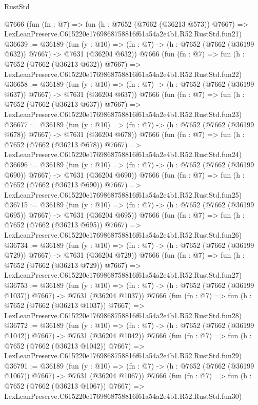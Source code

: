 \begin{lexlean}{RustStd}
\begin{coremodule}
    @7666
    (fun (fn : @7) =>
    fun (h : @7652 (@7662 (@36213 @573)) @7667) =>
    LexLeanPreserve.C615220e1769868758816f61a54a2e4b1.R52.RustStd.fun21)
@36639 := @36189
    (fun (y : @10) => (fn : @7) -> (h : @7652 (@7662 (@36199 @632)) @7667) -> @7631 (@36204 @632))
    @7666
    (fun (fn : @7) =>
    fun (h : @7652 (@7662 (@36213 @632)) @7667) =>
    LexLeanPreserve.C615220e1769868758816f61a54a2e4b1.R52.RustStd.fun22)
@36658 := @36189
    (fun (y : @10) => (fn : @7) -> (h : @7652 (@7662 (@36199 @637)) @7667) -> @7631 (@36204 @637))
    @7666
    (fun (fn : @7) =>
    fun (h : @7652 (@7662 (@36213 @637)) @7667) =>
    LexLeanPreserve.C615220e1769868758816f61a54a2e4b1.R52.RustStd.fun23)
@36677 := @36189
    (fun (y : @10) => (fn : @7) -> (h : @7652 (@7662 (@36199 @678)) @7667) -> @7631 (@36204 @678))
    @7666
    (fun (fn : @7) =>
    fun (h : @7652 (@7662 (@36213 @678)) @7667) =>
    LexLeanPreserve.C615220e1769868758816f61a54a2e4b1.R52.RustStd.fun24)
@36696 := @36189
    (fun (y : @10) => (fn : @7) -> (h : @7652 (@7662 (@36199 @690)) @7667) -> @7631 (@36204 @690))
    @7666
    (fun (fn : @7) =>
    fun (h : @7652 (@7662 (@36213 @690)) @7667) =>
    LexLeanPreserve.C615220e1769868758816f61a54a2e4b1.R52.RustStd.fun25)
@36715 := @36189
    (fun (y : @10) => (fn : @7) -> (h : @7652 (@7662 (@36199 @695)) @7667) -> @7631 (@36204 @695))
    @7666
    (fun (fn : @7) =>
    fun (h : @7652 (@7662 (@36213 @695)) @7667) =>
    LexLeanPreserve.C615220e1769868758816f61a54a2e4b1.R52.RustStd.fun26)
@36734 := @36189
    (fun (y : @10) => (fn : @7) -> (h : @7652 (@7662 (@36199 @729)) @7667) -> @7631 (@36204 @729))
    @7666
    (fun (fn : @7) =>
    fun (h : @7652 (@7662 (@36213 @729)) @7667) =>
    LexLeanPreserve.C615220e1769868758816f61a54a2e4b1.R52.RustStd.fun27)
@36753 := @36189
    (fun (y : @10) => (fn : @7) -> (h : @7652 (@7662 (@36199 @1037)) @7667) -> @7631 (@36204 @1037))
    @7666
    (fun (fn : @7) =>
    fun (h : @7652 (@7662 (@36213 @1037)) @7667) =>
    LexLeanPreserve.C615220e1769868758816f61a54a2e4b1.R52.RustStd.fun28)
@36772 := @36189
    (fun (y : @10) => (fn : @7) -> (h : @7652 (@7662 (@36199 @1042)) @7667) -> @7631 (@36204 @1042))
    @7666
    (fun (fn : @7) =>
    fun (h : @7652 (@7662 (@36213 @1042)) @7667) =>
    LexLeanPreserve.C615220e1769868758816f61a54a2e4b1.R52.RustStd.fun29)
@36791 := @36189
    (fun (y : @10) => (fn : @7) -> (h : @7652 (@7662 (@36199 @1067)) @7667) -> @7631 (@36204 @1067))
    @7666
    (fun (fn : @7) =>
    fun (h : @7652 (@7662 (@36213 @1067)) @7667) =>
    LexLeanPreserve.C615220e1769868758816f61a54a2e4b1.R52.RustStd.fun30)

\end{coremodule}
\end{lexlean}
